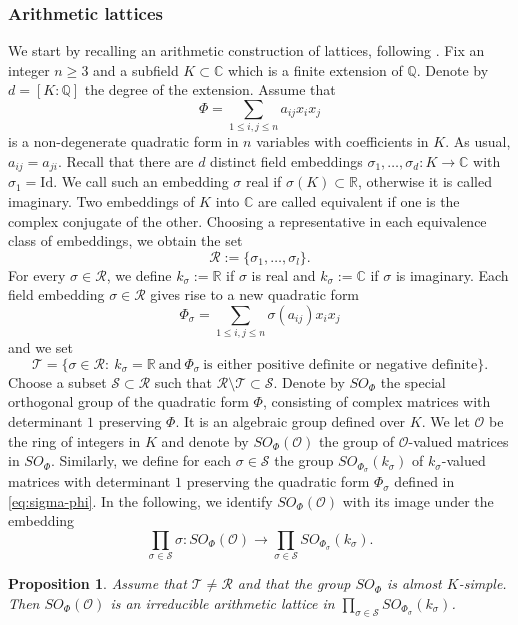 \documentclass[11pt, letterpaper, oneside,reqno]{amsart}
\theoremstyle{plain}
\newtheorem{prop}[thm]{Proposition}
\theoremstyle{underline}
\theoremstyle{definition}
\theoremstyle{remark}
\begin{document}
	\subsubsection{Arithmetic lattices}
	We start by recalling an arithmetic construction of lattices, following \cite[Chapter IX, \S 1.7]{Margulis}.
	Fix an integer $n\geq 3$ and a subfield $K\subset\mathbb{C}$ which is a finite extension of $\mathbb{Q}$. Denote by $d=[K:\mathbb{Q}]$ the degree of the extension. Assume that 
	\[
	\Phi=\sum_{1\leq i,j\leq n}a_{ij}x_ix_j
	\]
	is a non-degenerate quadratic form in $n$ variables with coefficients in $K$. As usual, $a_{ij}=a_{ji}$. Recall that there are $d$ distinct field embeddings $\sigma_1,\ldots,\sigma_d:K\rightarrow\mathbb{C}$ with $\sigma_1=\text{Id}$. We call such an embedding $\sigma$ real if $\sigma(K)\subset\mathbb{R}$, otherwise it is called imaginary. Two embeddings of $K$ into $\mathbb{C}$ are called equivalent if one is the complex conjugate of the other. Choosing a representative in each equivalence class of embeddings, we obtain the set
	\[
	\mathcal{R}:=\{\sigma_1,\ldots,\sigma_l\}.
	\]
	For every $\sigma\in\mathcal{R}$, we define $k_{\sigma}:=\mathbb{R}$ if $\sigma$ is real and $k_{\sigma}:=\mathbb{C}$ if $\sigma$ is imaginary. Each field embedding $\sigma\in\mathcal{R}$ gives rise to a new quadratic form
	\begin{equation}\label{eq:sigma-phi}
		\Phi_{\sigma}=\sum_{1\leq i,j\leq n}\sigma(a_{ij})x_ix_j
	\end{equation}
	and we set
	\[
	\mathcal{T}=\{\sigma\in\mathcal{R}:\ k_{\sigma}=\mathbb{R}\ \text{and}\ \Phi_{\sigma}\ \text{is either positive definite or negative definite}\}.
	\]
	Choose a subset $\mathcal{S}\subset\mathcal{R}$ such that $\mathcal{R}\setminus\mathcal{T}\subset\mathcal{S}$. Denote by $SO_{\Phi}$ the special orthogonal group of the quadratic form $\Phi$, consisting of complex matrices with determinant $1$ preserving $\Phi$. It is an algebraic group defined over $K$. We let $\mathcal{O}$ be the ring of integers in $K$ and denote by $SO_{\Phi}(\mathcal{O})$ the group of $\mathcal{O}$-valued matrices in $SO_{\Phi}$. Similarly, we define for each $\sigma\in \mathcal{S}$ the group $SO_{\Phi_{\sigma}}(k_{\sigma})$ of $k_{\sigma}$-valued matrices with determinant $1$ preserving the quadratic form $\Phi_{\sigma}$ defined in \eqref{eq:sigma-phi}.
	In the following, we identify $SO_{\Phi}(\mathcal{O})$ with its image under the embedding
	\[
	\prod_{\sigma\in \mathcal{S}}\sigma:SO_{\Phi}(\mathcal{O})\rightarrow\prod_{\sigma\in \mathcal{S}}SO_{\Phi_{\sigma}}(k_{\sigma}).
	\]
	\begin{prop}\cite[Chapter IX, \S 1.7]{Margulis}\label{prop:lattice}
		Assume that $\mathcal{T}\neq\mathcal{R}$ and that the group $SO_{\Phi}$ is almost $K$-simple. Then $SO_{\Phi}(\mathcal{O})$ is an irreducible arithmetic lattice in $\prod_{\sigma\in \mathcal{S}}SO_{\Phi_{\sigma}}(k_{\sigma})$.
	\end{prop}
	
\end{document}

